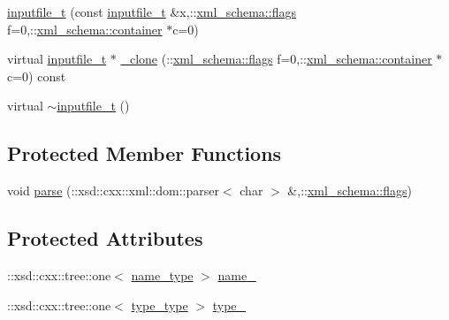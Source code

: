 \begin{DoxyCompactItemize}
\item 
\hyperlink{classinputfile__t_a6faa9460f16ce6f4d19e5482301d21bb}{inputfile\-\_\-t} (const \hyperlink{classinputfile__t}{inputfile\-\_\-t} \&x,\-::\hyperlink{namespacexml__schema_a0612287d030cb2732d31a45b258fdc87}{xml\-\_\-schema\-::flags} f=0,\-::\hyperlink{namespacexml__schema_ada9aa30dc722e93ee2ed7243085402a5}{xml\-\_\-schema\-::container} $\ast$c=0)
\item 
virtual \hyperlink{classinputfile__t}{inputfile\-\_\-t} $\ast$ \hyperlink{classinputfile__t_ad5a888bcf78e692a206899e5fb64074c}{\-\_\-clone} (\-::\hyperlink{namespacexml__schema_a0612287d030cb2732d31a45b258fdc87}{xml\-\_\-schema\-::flags} f=0,\-::\hyperlink{namespacexml__schema_ada9aa30dc722e93ee2ed7243085402a5}{xml\-\_\-schema\-::container} $\ast$c=0) const 
\item 
virtual \hyperlink{classinputfile__t_a51d305c8e979f80d0430333b3663211d}{$\sim$inputfile\-\_\-t} ()
\end{DoxyCompactItemize}
\subsection*{Protected Member Functions}
\begin{DoxyCompactItemize}
\item 
void \hyperlink{classinputfile__t_a456996966d112692aef85483b0e388e3}{parse} (\-::xsd\-::cxx\-::xml\-::dom\-::parser$<$ char $>$ \&,\-::\hyperlink{namespacexml__schema_a0612287d030cb2732d31a45b258fdc87}{xml\-\_\-schema\-::flags})
\end{DoxyCompactItemize}
\subsection*{Protected Attributes}
\begin{DoxyCompactItemize}
\item 
\-::xsd\-::cxx\-::tree\-::one$<$ \hyperlink{classinputfile__t_a78bf4131e7e2a433bfe95f85b2a5e1da}{name\-\_\-type} $>$ \hyperlink{classinputfile__t_a511fa53cd30df30388bbb0d6667e04e5}{name\-\_\-}
\item 
\-::xsd\-::cxx\-::tree\-::one$<$ \hyperlink{classinputfile__t_a3f28e99146a586a8f55154818cdfe1ad}{type\-\_\-type} $>$ \hyperlink{classinputfile__t_aac635b58fd41459baf72cb928c4f41b1}{type\-\_\-}
\end{DoxyCompactItemize}


